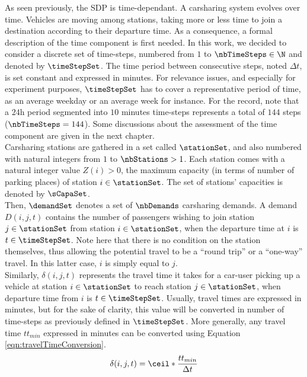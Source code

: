 \begin{bibunit}[ieeetr]
As seen previously, the SDP is time-dependant.
A carsharing system evolves over time.
Vehicles are moving among stations, taking more or less time to join a destination according to their departure time.
As a consequence, a formal description of the time component is first needed.
In this work, we decided to consider a discrete set of time-steps, numbered from $1$ to $\nbTimeSteps \in \N$ and denoted by $\timeStepSet$.
The time period between consecutive steps, noted $\Delta t$, is set constant and expressed in minutes.
For relevance issues, and especially for experiment purposes, $\timeStepSet$ has to cover a representative period of time, as an average weekday or an average week for instance.
For the record, note that a $24$h period segmented into $10$ minutes time-steps represents a total of $144$ steps (\ie $\nbTimeSteps = 144$).
Some discussions about the assessment of the time component are given in the next chapter.
~\\

Carsharing stations are gathered in a set called $\stationSet$, and also numbered with natural integers from $1$ to $\nbStations > 1$.
Each station comes with a natural integer value $Z(i) > 0$, the maximum capacity (in terms of number of parking places) of station $i \in \stationSet$.
The set of stations' capacities is denoted by $\sCapaSet$.
~\\

Then, $\demandSet$ denotes a set of $\nbDemands$ carsharing demands.
A demand $D(i,j,t)$ contains the number of passengers wishing to join station $j \in \stationSet$ from station $i \in \stationSet$, when the departure time at $i$ is $t \in \timeStepSet$.
Note here that there is no condition on the station themselves, thus allowing the potential travel to be a ``round trip'' or a ``one-way'' travel.
In this latter case, $i$ is simply equal to $j$.
~\\

Similarly, $\delta(i,j,t)$ represents the travel time it takes for a car-user picking up a vehicle at station $i \in \stationSet$ to reach station $j \in \stationSet$, when departure time from $i$ is $t \in \timeStepSet$.
Usually, travel times are expressed in minutes, but for the sake of clarity, this value will be converted in number of time-steps as previously defined in $\timeStepSet$.
More generally, any travel time $tt_{min}$ expressed in minutes can be converted using Equation \ref{eqn:travelTimeConversion}.
\begin{equation}\label{eqn:travelTimeConversion}
\delta(i,j,t) = \ceil*{\frac{tt_{min}}{\Delta t}}
\end{equation}


\end{bibunit}
